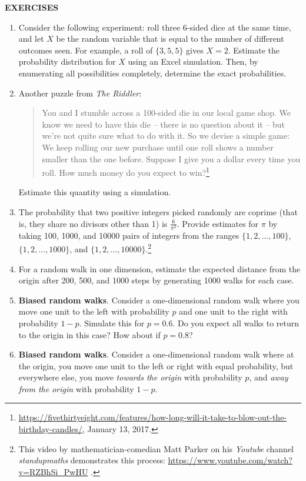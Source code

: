 \begin{center}
	\textbf{EXERCISES}
\end{center}

\begin{enumerate}[label={3.\arabic*},leftmargin=1cm]
	\item Consider the following experiment: roll three 6-sided dice at the same time, and let $X$ be the random variable that is equal to the number of different outcomes seen. For example, a roll of $\{3, 5, 5\}$ gives $X = 2$. Estimate the probability distribution for $X$ using an Excel simulation. Then, by enumerating all possibilities completely, determine the exact probabilities.
	\item Another puzzle from \emph{The Riddler}:
		\begin{quote}
			You and I stumble across a 100-sided die in our local game shop.
		We know we need to have this die -- there is no question about it -- but we're not quite sure what to do with it.
		So we devise a simple game: We keep rolling our new purchase until one roll shows a number smaller than the one before.
		Suppose I give you a dollar every time you roll.
		How much money do you expect to win?\footnote{\url{https://fivethirtyeight.com/features/how-long-will-it-take-to-blow-out-the-birthday-candles/}, January 13, 2017.}
	\end{quote}
		Estimate this quantity using a simulation.
	      \item The probability that two positive integers picked randomly are coprime (that is, they share no divisors other than 1) is $\frac{6}{\pi^2}$.
		Provide estimates for $\pi$ by taking 100, 1000, and 10000 pairs of integers from the ranges $\{1,2,\ldots,100\}$, $\{1,2,\ldots,1000\}$, and $\{1,2,\ldots,10000\}$.\footnote{This video by mathematician-comedian Matt Parker on his \emph{Youtube} channel \emph{standupmaths} demonstrates this process: \url{https://www.youtube.com/watch?v=RZBhSi\_PwHU} .}
	\item For a random walk in one dimension, estimate the expected distance from the origin after 200, 500, and 1000 steps by generating 1000 walks for each case.
	\item \textbf{Biased random walks}. Consider a one-dimensional random walk where you move one unit to the left with probability $p$ and one unit to the right with probability $1 - p$.
		Simulate this for $p = 0.6$.
		Do you expect all walks to return to the origin in this case?
		How about if $p = 0.8$?
	\item \textbf{Biased random walks}. Consider a one-dimensional random walk where at the origin, you move one unit to the left or right with equal probability, but everywhere else, you move \emph{towards the origin} with probability $p$, and \emph{away from the origin} with probability $1-p$.

\end{enumerate}
